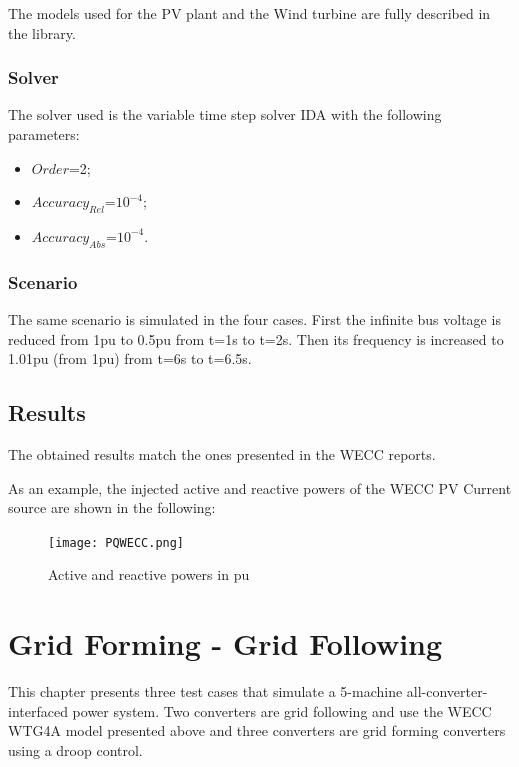 \documentclass[a4paper, 12pt]{report}
\begin{document}
\par The models used for the PV plant and the Wind turbine are fully described in the \Dynawo library.

\subsection{Solver}

\par The solver used is the variable time step solver IDA with the following parameters:
\begin{itemize}
\item $Order$=2;
\item $Accuracy_{Rel}$=$10^{-4}$;
\item $Accuracy_{Abs}$=$10^{-4}$.
\end{itemize}

\subsection{Scenario}

\par The same scenario is simulated in the four cases. First the infinite bus voltage is reduced from 1pu to 0.5pu from t=1s to t=2s. Then its frequency is increased to 1.01pu (from 1pu) from t=6s to t=6.5s.

\section{Results}

\par The obtained results match the ones presented in the WECC reports.

\par As an example, the injected active and reactive powers of the WECC PV Current source are shown in the following:

\begin{figure}[H]
  \texttt{[image: PQWECC.png]}
  \caption{Active and reactive powers in pu}
\end{figure}


\chapter{Grid Forming - Grid Following}

This chapter presents three test cases that simulate a 5-machine all-converter-interfaced power system.
Two converters are grid following and use the WECC WTG4A model presented above and three converters are grid forming converters using a droop control.
\end{document}
